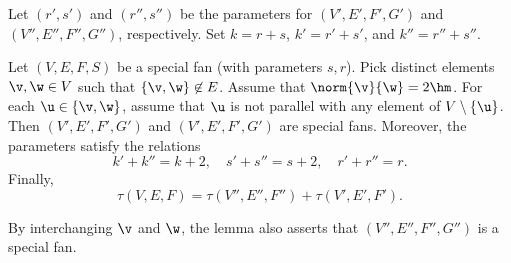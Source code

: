 Let $(r',s')$ and $(r'',s'')$ be the parameters for $(V',E',F',G')$
and $(V'',E'',F'',G'')$, respectively.  Set $k=r+s$, $k'=r'+s'$, and
$k''=r''+s''$.

\begin{lemma}[]\label{lemma:param-add}  
Let $(V,E,F,S)$ be a special fan (with parameters $s,r$).  Pick
distinct elements $\v,\w\in V$ such that $\{\v,\w\}\not\in E$.
Assume that $\norm{\v}{\w}=2\hm$.  For each $\u\in \{\v,\w\}$,
assume that $\u$ is not parallel with any element of 
$V\setminus\{\u\}$.
Then $(V',E',F',G')$ and $(V',E',F',G')$ are special fans.  Moreover,
the parameters satisfy the relations
\begin{displaymath}
k'+k'' = k + 2,\quad s'+s'' = s + 2,\quad r'+r''=r.
\end{displaymath}
Finally,
\begin{displaymath}
\tau(V,E,F)= \tau(V'',E'',F'') +\tau(V',E',F').
\end{displaymath}
\end{lemma}

By interchanging $\v$ and $\w$, the lemma also asserts that
$(V'',E'',F'',G'')$ is a special fan.

